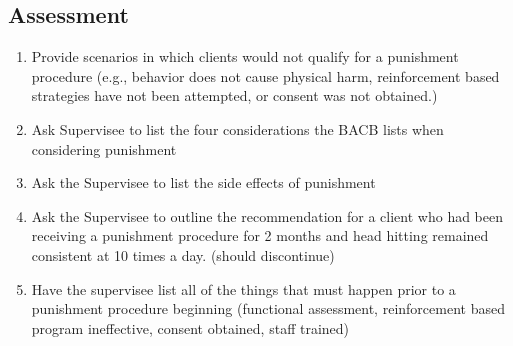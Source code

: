 \subsection{Assessment}
\begin{enumerate}
\item Provide scenarios in which clients would not qualify for a punishment procedure (e.g., behavior does not cause physical harm, reinforcement based strategies have not been attempted, or consent was not obtained.)
\item Ask Supervisee to list the four considerations the BACB lists when considering punishment
\item Ask the Supervisee to list the side effects of punishment
\item Ask the Supervisee to outline the recommendation for a client who had been receiving a punishment procedure for 2 months and head hitting remained consistent at 10 times a day. (should discontinue)
\item Have the supervisee list all of the things that must happen prior to a punishment procedure beginning (functional assessment, reinforcement based program ineffective, consent obtained, staff trained)
\end{enumerate}
%

